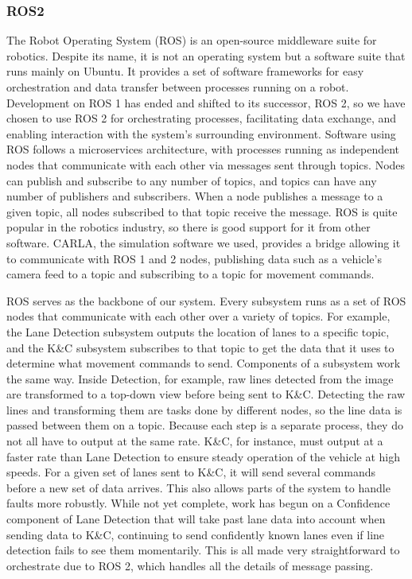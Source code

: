 \documentclass[titlepage, draft]{article}
\begin{document}
{\subsubsection{ROS2}
The Robot Operating System (ROS) is an open-source middleware suite for robotics. Despite its name, it is not an operating system but a software suite that runs mainly on Ubuntu. It provides a set of software frameworks for easy orchestration and data transfer between processes running on a robot. \cite{ros_documentation} Development on ROS 1 has ended and shifted to its successor, ROS 2, so we have chosen to use ROS 2 for orchestrating processes, facilitating data exchange, and enabling interaction with the system's surrounding environment. Software using ROS follows a microservices architecture, with processes running as independent nodes that communicate with each other via messages sent through topics. Nodes can publish and subscribe to any number of topics, and topics can have any number of publishers and subscribers. When a node publishes a message to a given topic, all nodes subscribed to that topic receive the message. ROS is quite popular in the robotics industry, so there is good support for it from other software. CARLA, the simulation software we used, provides a bridge allowing it to communicate with ROS 1 and 2 nodes, publishing data such as a vehicle's camera feed to a topic and subscribing to a topic for movement commands.

ROS serves as the backbone of our system. Every subsystem runs as a set of ROS nodes that communicate with each other over a variety of topics. For example, the Lane Detection subsystem outputs the location of lanes to a specific topic, and the K\&C subsystem subscribes to that topic to get the data that it uses to determine what movement commands to send. Components of a subsystem work the same way. Inside Detection, for example, raw lines detected from the image are transformed to a top-down view before being sent to K\&C. Detecting the raw lines and transforming them are tasks done by different nodes, so the line data is passed between them on a topic. Because each step is a separate process, they do not all have to output at the same rate. K\&C, for instance, must output at a faster rate than Lane Detection to ensure steady operation of the vehicle at high speeds. For a given set of lanes sent to K\&C, it will send several commands before a new set of data arrives. This also allows parts of the system to handle faults more robustly. While not yet complete, work has begun on a Confidence component of Lane Detection that will take past lane data into account when sending data to K\&C, continuing to send confidently known lanes even if line detection fails to see them momentarily. This is all made very straightforward to orchestrate due to ROS 2, which handles all the details of message passing.

}
\end{document}
